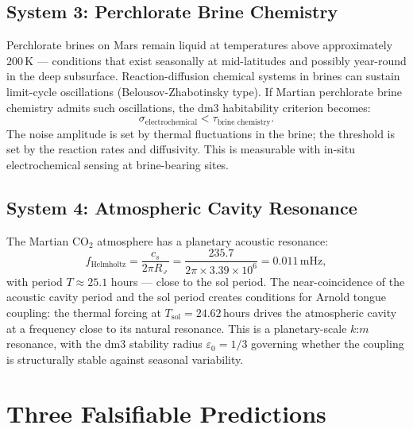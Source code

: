 \subsection{System 3: Perchlorate Brine Chemistry}

Perchlorate brines on Mars remain liquid at temperatures above
approximately $200\,\mathrm{K}$ --- conditions that exist seasonally
at mid-latitudes and possibly year-round in the deep subsurface.
Reaction-diffusion chemical systems in brines can sustain limit-cycle
oscillations (Belousov-Zhabotinsky type). If Martian perchlorate brine
chemistry admits such oscillations, the dm3 habitability criterion
becomes:
\[
\sigma_{\text{electrochemical}} < \tau_{\text{brine chemistry}}.
\]
The noise amplitude is set by thermal fluctuations in the brine;
the threshold is set by the reaction rates and diffusivity. This
is measurable with in-situ electrochemical sensing at brine-bearing sites.

\subsection{System 4: Atmospheric Cavity Resonance}

The Martian CO$_2$ atmosphere has a planetary acoustic resonance:
\[
f_{\text{Helmholtz}} = \frac{c_s}{2\pi R_\Mars}
= \frac{235.7}{2\pi \times 3.39 \times 10^6}
= 0.011\,\mathrm{mHz},
\]
with period $T \approx 25.1$ hours --- close to the sol period.
The near-coincidence of the acoustic cavity period and the sol period
creates conditions for Arnold tongue coupling: the thermal forcing at
$T_{\text{sol}} = 24.62\,\mathrm{hours}$ drives the atmospheric
cavity at a frequency close to its natural resonance. This is a
planetary-scale $k$:$m$ resonance, with the dm3 stability radius
$\varepsilon_0 = 1/3$ governing whether the coupling is structurally
stable against seasonal variability.

\section{Three Falsifiable Predictions}
\label{sec:mars-predictions}


